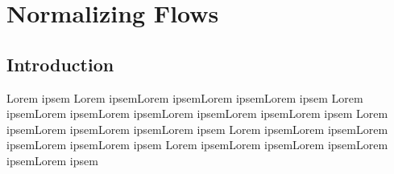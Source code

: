 \chapter{Normalizing Flows}
\label{chapter:normalizingflows}

\section{Introduction}

Lorem ipsem Lorem ipsemLorem ipsemLorem ipsemLorem ipsem
Lorem ipsemLorem ipsemLorem ipsemLorem ipsemLorem ipsemLorem ipsem
Lorem ipsemLorem ipsemLorem ipsemLorem ipsem
Lorem ipsemLorem ipsemLorem ipsemLorem ipsemLorem ipsem
Lorem ipsemLorem ipsemLorem ipsemLorem ipsemLorem ipsem
